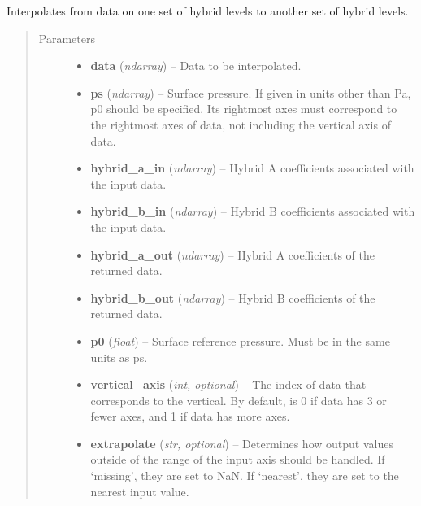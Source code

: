 \documentclass[letterpaper,10pt,english]{sphinxmanual}
\begin{document}

\begin{fulllineitems}
\label{atmos:atmos.util.hybrid_interpolate}
Interpolates from data on one set of hybrid levels to another set of hybrid
levels.
\begin{quote}\begin{description}
\item[{Parameters}] \leavevmode\begin{itemize}
\item {} 
\textbf{data} (\emph{ndarray}) -- Data to be interpolated.

\item {} 
\textbf{ps} (\emph{ndarray}) -- Surface pressure. If given in units other than Pa, p0 should be
specified. Its rightmost axes must correspond to the rightmost axes
of data, not including the vertical axis of data.

\item {} 
\textbf{hybrid\_a\_in} (\emph{ndarray}) -- Hybrid A coefficients associated with the input data.

\item {} 
\textbf{hybrid\_b\_in} (\emph{ndarray}) -- Hybrid B coefficients associated with the input data.

\item {} 
\textbf{hybrid\_a\_out} (\emph{ndarray}) -- Hybrid A coefficients of the returned data.

\item {} 
\textbf{hybrid\_b\_out} (\emph{ndarray}) -- Hybrid B coefficients of the returned data.

\item {} 
\textbf{p0} (\emph{float}) -- Surface reference pressure. Must be in the same units as ps.

\item {} 
\textbf{vertical\_axis} (\emph{int, optional}) -- The index of data that corresponds to the vertical. By default, is 0 if
data has 3 or fewer axes, and 1 if data has more axes.

\item {} 
\textbf{extrapolate} (\emph{str, optional}) -- Determines how output values outside of the range of the input axis
should be handled. If `missing', they are set to NaN. If `nearest',
they are set to the nearest input value.


\end{itemize}
\end{description}
\end{quote}
\end{fulllineitems}
\end{document}
